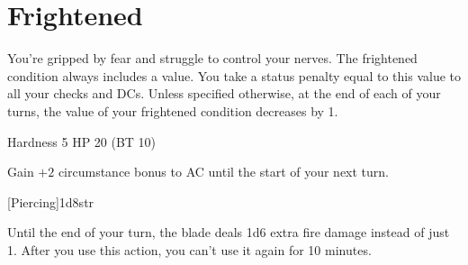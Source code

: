 \documentclass[paper=63mm:88mm, DIV=21, fontsize=7.5pt]{scrartcl}
\begin{document}
\section{Frightened}

You're gripped by fear and struggle to control your nerves.
The frightened condition always includes a value.
You take a status penalty equal to this value to all your checks and DCs.
Unless specified otherwise, at the end of each of your turns, the value of your frightened condition decreases by 1.



Hardness 5
HP 20 (BT 10)



Gain \(+2\) circumstance bonus to AC until the start of your next turn.









[Piercing]{1d8}{str}



Until the end of your turn, the blade deals 1d6 extra fire damage instead of just 1. After you use this action, you can't use it again for 10 minutes.

\vfill

\end{document}
